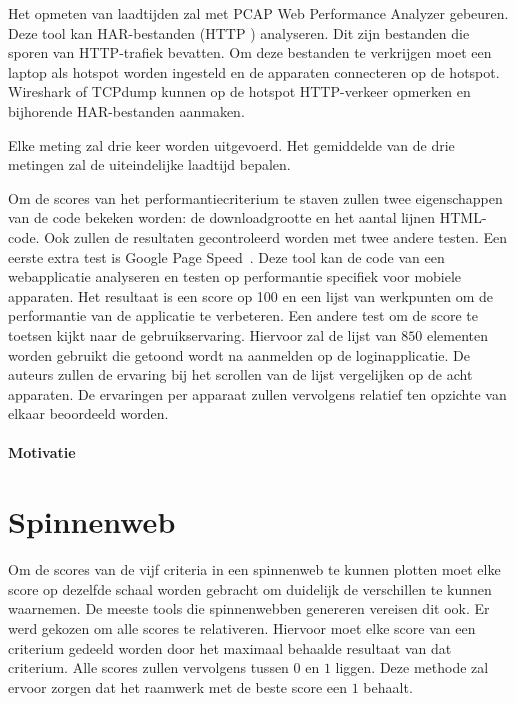 Het opmeten van laadtijden zal met PCAP Web Performance Analyzer gebeuren. %
Deze tool kan HAR-bestanden (HTTP ) analyseren.
Dit zijn bestanden die sporen van HTTP-trafiek bevatten.
Om deze bestanden te verkrijgen moet een laptop als hotspot worden ingesteld en de apparaten connecteren op de hotspot.
Wireshark of TCPdump kunnen op de hotspot HTTP-verkeer opmerken en bijhorende HAR-bestanden aanmaken.

Elke meting zal drie keer worden uitgevoerd.
Het gemiddelde van de drie metingen zal de uiteindelijke laadtijd bepalen.

Om de scores van het performantiecriterium te staven zullen twee eigenschappen van de code bekeken worden:  de downloadgrootte en het aantal lijnen HTML-code.
Ook zullen de resultaten gecontroleerd worden met twee andere testen.
Een eerste extra test is Google Page Speed~\cite{Morgan2011}. 
Deze tool kan de code van een webapplicatie analyseren en testen op performantie specifiek voor mobiele apparaten.
Het resultaat is een score op 100 en een lijst van werkpunten om de performantie van de applicatie te verbeteren.
Een andere test om de score te toetsen kijkt naar de gebruikservaring.
Hiervoor zal de lijst van $850$ elementen worden gebruikt die getoond wordt na aanmelden op de loginapplicatie.
De auteurs zullen de ervaring bij het scrollen van de lijst vergelijken op de acht apparaten.
De ervaringen per apparaat zullen vervolgens relatief ten opzichte van elkaar beoordeeld worden.

\paragraph{Motivatie}


\section{Spinnenweb}
\label{sec:vergelijking-spinnenweb}

Om de scores van de vijf criteria in een spinnenweb te kunnen plotten moet elke score op dezelfde schaal worden gebracht om duidelijk de verschillen te kunnen waarnemen.
De meeste tools die spinnenwebben genereren vereisen dit ook. %
Er werd gekozen om alle scores te relativeren.
Hiervoor moet elke score van een criterium gedeeld worden door het maximaal behaalde resultaat van dat criterium.
Alle scores zullen vervolgens tussen $0$ en $1$ liggen.
Deze methode zal ervoor zorgen dat het raamwerk met de beste score een $1$ behaalt.

